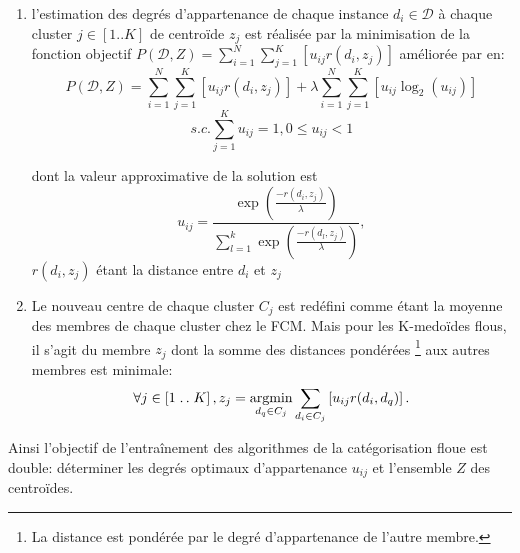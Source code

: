 \begin{enumerate}
 \item l'estimation des degrés d'appartenance de chaque instance $d_i \in \mathcal{D}$ à chaque cluster $j \in [1..K]$ de centroïde $z_j$ est réalisée par la minimisation de la fonction objectif $P(\mathcal{D},Z) = \sum\limits_{i=1}^{N}\sum\limits_{j=1}^{K} \left[u_{ij}r(d_i,z_j)\right]$ \citep{krishnapuram2001fuzzycmedoids}  améliorée par \citet{sabzi2011fuzzykmedoids} en:
 \[P(\mathcal{D},Z) = \sum\limits_{i=1}^{N}\sum\limits_{j=1}^{K} \left[u_{ij}r(d_i,z_j)\right] + \lambda \sum\limits_{i=1}^{N}\sum\limits_{j=1}^{K} \left[ u_{ij}\log_2(u_{ij}) \right] \]
 \[s.c. \sum\limits_{j=1}^{K} u_{ij} = 1, 0 \leq u_{ij} < 1\]
 
 dont la valeur approximative de la solution est \[u_{ij} = \frac{\exp\left(\frac{-r(d_i,z_j)}{\lambda}\right)}{\sum_{l=1}^{k}\exp\left(\frac{-r(d_l,z_j)}{\lambda}\right)},\] $r(d_i,z_j)$ étant la distance entre $d_i$ et  $z_j$
 \item Le nouveau centre de chaque cluster $C_j$ est redéfini comme étant la moyenne des membres de chaque cluster chez le FCM. Mais pour les K-medoïdes flous, il s'agit du membre $z_j$ dont la somme des distances pondérées \footnote{La distance est pondérée par le degré d'appartenance de l'autre membre.} aux autres membres  est minimale: 
  \[\forall j \in  \left[1\mathrel{{.}\,{.}}\nobreak K \right], z_j = \mathop{\mathrm{argmin}}\limits\limits_{d_q \in C_j} \sum\limits_{d_i \in C_j} \left[u_{ij}r(d_{i},d_{q})\right].\] %
  
\end{enumerate}
 Ainsi l'objectif de l'entraînement des algorithmes de la catégorisation floue est double: déterminer les degrés optimaux d'appartenance $u_{ij}$ et l'ensemble $Z$ des centroïdes. 


